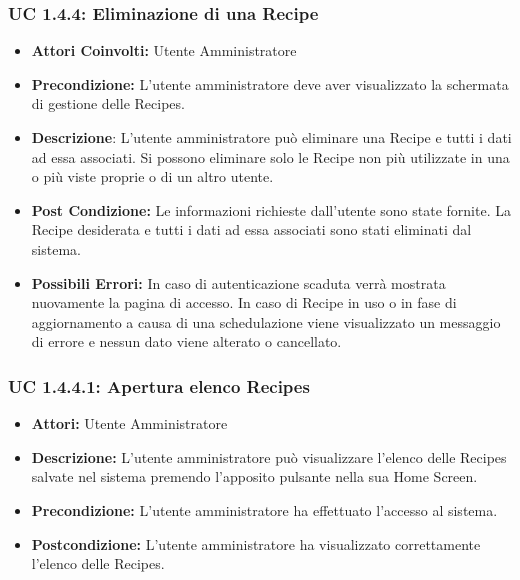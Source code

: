 \subsubsection{UC 1.4.4: Eliminazione di una Recipe}

\begin{itemize}
    \item \textbf{Attori Coinvolti:}
    Utente Amministratore

    \item \textbf{Precondizione:}
    L'utente amministratore deve aver visualizzato la schermata di gestione delle Recipes.

    \item \textbf{Descrizione}:
    L'utente amministratore può eliminare una Recipe e tutti i dati ad essa associati.
    Si possono eliminare solo le Recipe non più utilizzate in una o più viste proprie o di un altro utente.

    \item \textbf{Post Condizione:}
    Le informazioni richieste dall'utente sono state fornite.
    La Recipe desiderata e tutti i dati ad essa associati sono stati eliminati dal sistema.

    \item \textbf{Possibili Errori:}
    In caso di autenticazione scaduta verrà mostrata nuovamente la pagina di accesso.
    In caso di Recipe in uso o in fase di aggiornamento a causa di una schedulazione viene visualizzato un messaggio di errore e nessun dato viene alterato o cancellato.
\end{itemize}

\subsubsection{UC 1.4.4.1: Apertura elenco Recipes}

\begin{itemize}
    \item \textbf{Attori:} Utente Amministratore
    \item \textbf{Descrizione:} L'utente amministratore può visualizzare l'elenco delle Recipes salvate nel sistema premendo l'apposito pulsante nella sua Home Screen.
    \item \textbf{Precondizione:} L'utente amministratore ha effettuato l'accesso al sistema.
    \item \textbf{Postcondizione:} L'utente amministratore ha visualizzato correttamente l'elenco delle Recipes.
\end{itemize}

